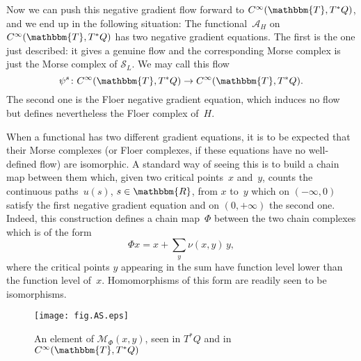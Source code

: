 \documentclass[12pt,twoside]{amsart}
\theoremstyle{plain}
\numberwithin{figure}{section}
\numberwithin{equation}{section}
\def\ca{{\mathcal A}}
\def\cm{{\mathcal M}}
\def\cs{{\mathcal S}}
\def\RR{\mathbbm{R}}
\def\TT{\mathbbm{T}}
\begin{document}
Now we can push this negative gradient flow forward to $C^{\infty}(\TT,T^*Q)$, and we end up in the following situation: The functional~$\ca_H$ on~$C^{\infty}(\TT,T^*Q)$ has two negative gradient equations. The first is the one just described: it gives a genuine flow and the corresponding Morse complex is just the Morse complex of $\mathcal{S}_L$. We may call this flow 
\[
\psi^s \colon C^{\infty}(\TT,T^*Q) \rightarrow C^{\infty}(\TT,T^*Q).
\]
The second one is the Floer negative gradient equation, which induces no flow but defines nevertheless the Floer complex of~$H$.

When a functional has two different gradient equations, it is to be expected that their Morse complexes (or Floer complexes, if these equations have no well-defined flow) are isomorphic. 
A standard way of seeing this is to build a chain map between them which, given two critical points~$x$ and~$y$, counts the continuous paths~$u(s)$, $s\in \RR$, from $x$ to~$y$ 
which on $(-\infty,0)$ satisfy the first negative gradient equation and on $(0,+\infty)$ the second one. Indeed, this construction defines a chain map~$\Phi$ between the two chain complexes which is of the form
\[
\Phi x = x + \sum_y \nu(x,y) \, y,
\]
where the critical points $y$ appearing in the sum have function level lower than the function level of~$x$. Homomorphisms of this form are readily seen to be isomorphisms.

\begin{figure}[h]   
 \begin{center}
  \psfrag{-A}{\footnotesize $-\nabla \ca_H$}
  \psfrag{-S}{\footnotesize $-\nabla \cs_L$}
  \psfrag{c}{\footnotesize $C^\infty (\TT, Q)$}
  \psfrag{C}{\footnotesize $C^\infty (\TT, T_q^*Q)$}
  \leavevmode\texttt{[image: fig.AS.eps]}
 \end{center}
 \caption{An element of $\cm_\Phi (x,y)$, seen in $T^*Q$ and in $C^\infty (\TT, T^*Q)$}  \label{fig.AS}
\end{figure}
\end{document}
